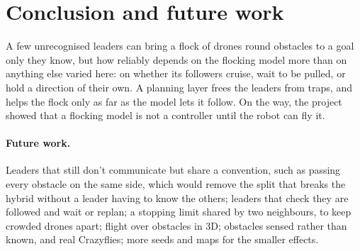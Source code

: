 \section{Conclusion and future work}
\label{sec:conclusion}

A few unrecognised leaders can bring a flock of drones round obstacles to a
goal only they know, but how reliably depends on the flocking model more than
on anything else varied here: on whether its followers cruise, wait to be
pulled, or hold a direction of their own. A planning layer frees the leaders
from traps, and helps the flock only as far as the model lets it follow. On
the way, the project showed that a flocking model is not a controller until
the robot can fly it.

\paragraph{Future work.} Leaders that still don't communicate but share a
convention, such as passing every obstacle on the same side, which would
remove the split that breaks the hybrid without a leader having to know the
others; leaders that check they are followed and
wait or replan; a stopping limit shared by two neighbours, to keep crowded
drones apart; flight over obstacles in 3D; obstacles sensed rather than
known, and real Crazyflies; more seeds and maps for the smaller effects.
